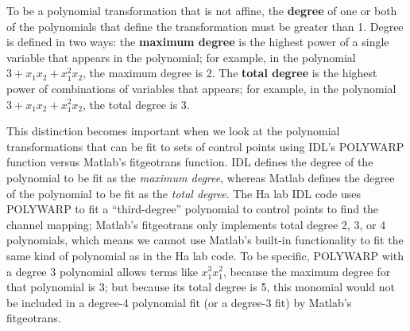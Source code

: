 \documentclass[11pt]{article}
\begin{document}
To be a polynomial transformation that is not affine, the {\bf degree} of one or both of the polynomials that define the transformation must be greater than 1. Degree is defined in two ways: the {\bf maximum degree} is the highest power of a single variable that appears in the polynomial; for example, in the polynomial $3+x_1x_2+x_1^2x_2$, the maximum degree is 2.  The {\bf total degree} is the highest power of combinations of variables that appears; for example, in the polynomial $3+x_1x_2+x_1^2x_2$, the total degree is 3.

This distinction becomes important when we look at the polynomial transformations that can be fit to sets of control points using IDL's POLYWARP function versus Matlab's fitgeotrans function.  IDL defines the degree of the polynomial to be fit as the {\it maximum degree}, whereas Matlab defines the degree of the polynomial to be fit as the {\it total degree}.  The Ha lab IDL code uses POLYWARP to fit a ``third-degree'' polynomial to control points to find the channel mapping; Matlab's fitgeotrans only implements total degree 2, 3, or 4 polynomials, which means we cannot use Matlab's built-in functionality to fit the same kind of polynomial as in the Ha lab code.  To be specific, POLYWARP with a degree 3 polynomial allows terms like $x_1^3x_1^2$, because the maximum degree for that polynomial is 3; but because its total degree is 5, this monomial would not be included in a degree-4 polynomial fit (or a degree-3 fit) by Matlab's fitgeotrans.
\end{document}
